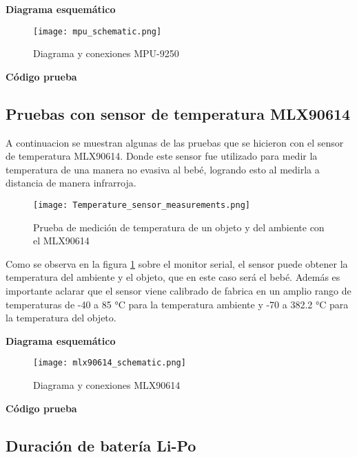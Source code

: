 \textbf{Diagrama esquemático}
\begin{figure}[htp!]
    \centering
    \texttt{[image: mpu\_schematic.png]}
    \caption{Diagrama y conexiones MPU-9250}
\end{figure}
\FloatBarrier
\textbf{Código prueba}

\lstset{style=mystyle}



\subsection{Pruebas con sensor de temperatura MLX90614}

A continuacion se muestran algunas de las pruebas que se hicieron con el sensor de temperatura MLX90614.
Donde este sensor fue utilizado para medir la temperatura de una manera no evasiva al bebé, logrando esto
al medirla a distancia de manera infrarroja.

\begin{figure}[htp!]
    \centering
    \texttt{[image: Temperature\_sensor\_measurements.png]}
    \caption{Prueba de medición de temperatura de un objeto y del ambiente con el MLX90614}
    \label{fig: temperature_measurements}
\end{figure}
\FloatBarrier

Como se observa en la figura \ref{fig: temperature_measurements} sobre el monitor serial, el sensor puede obtener la temperatura del
ambiente y el objeto, que en este caso será el bebé. Además es importante aclarar que el sensor viene calibrado de fabrica en un amplio rango de temperaturas de
-40 a 85 °C para la temperatura ambiente y -70 a 382.2 °C para la temperatura del objeto.\newline

\textbf{Diagrama esquemático}
\begin{figure}[htp!]
    \centering
    \texttt{[image: mlx90614\_schematic.png]}
    \caption{Diagrama y conexiones MLX90614}
\end{figure}
\FloatBarrier
\textbf{Código prueba}

\lstset{style=mystyle}



\subsection{Duración de batería Li-Po}

